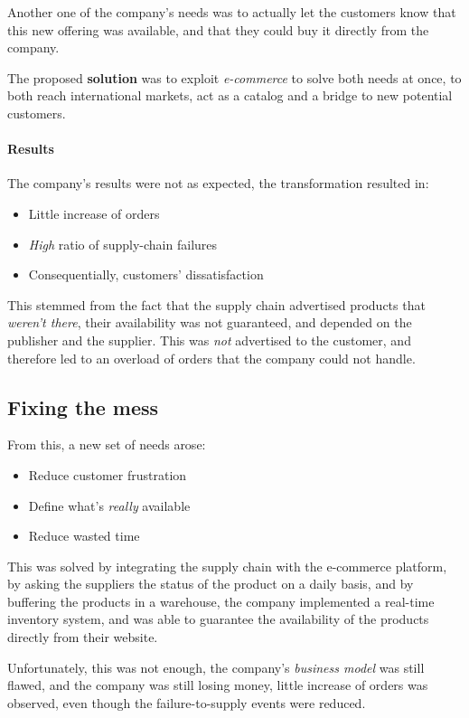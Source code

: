 \documentclass[openright, twoside, twocolumn]{report}
\begin{document}
Another one of the company's needs was to actually let the customers know that this new offering was available, and that they could buy it directly from the company.

The proposed \textbf{solution} was to exploit \emph{e-commerce} to solve both needs at once, to both reach international markets, act as a catalog and
a bridge to new potential customers.

\paragraph{Results}

The company's results were not as expected, the transformation resulted in:

\begin{itemize}
  \item Little increase of orders
  \item \emph{High} ratio of supply-chain failures
  \item Consequentially, customers' dissatisfaction
\end{itemize}

This stemmed from the fact that the supply chain advertised products that \emph{weren't there}, their availability was not guaranteed, and depended on
the publisher and the supplier. This was \emph{not} advertised to the customer, and therefore led to an overload of orders that the company could not
handle.

\subsection{Fixing the mess}

From this, a new set of needs arose:

\begin{itemize}
  \item Reduce customer frustration
  \item Define what's \emph{really} available
  \item Reduce wasted time
\end{itemize}

This was solved by integrating the supply chain with the e-commerce platform, by asking the suppliers the status of the product on a daily basis, and by
buffering the products in a warehouse, the company implemented a real-time inventory system, and was able to guarantee the availability of the products
directly from their website.

Unfortunately, this was not enough, the company's \emph{business model} was still flawed, and the company was still losing money, little
increase of orders was observed, even though the failure-to-supply events were reduced.
\end{document}
